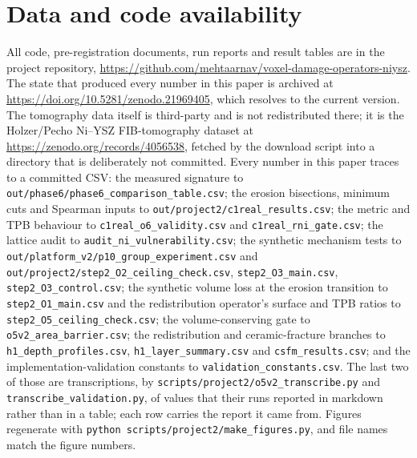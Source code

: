 \documentclass[5p,times,twocolumn]{elsarticle}
\begin{document}
\section*{Data and code availability}

\begingroup\sloppy
All code, pre-registration documents, run reports and result tables are in the
project repository, \url{https://github.com/mehtaarnav/voxel-damage-operators-niysz}.
The state that produced every number in this paper is archived at
\url{https://doi.org/10.5281/zenodo.21969405}, which resolves to the current
version.
The tomography data itself is third-party and is not redistributed there; it is
the Holzer/Pecho Ni--YSZ FIB-tomography dataset at
\url{https://zenodo.org/records/4056538}, fetched by the download script into a
directory that is deliberately not committed.
Every number in this paper
traces to a committed CSV: the measured signature to
\texttt{out/phase6/phase6\_comparison\_table.csv}; the erosion bisections,
minimum cuts and Spearman inputs to \texttt{out/project2/c1real\_results.csv};
the metric and TPB behaviour to \texttt{c1real\_o6\_validity.csv} and
\texttt{c1real\_rni\_gate.csv}; the lattice audit to
\texttt{audit\_ni\_vulnerability.csv}; the synthetic mechanism tests to
\texttt{out/platform\_v2/p10\_group\_experiment.csv} and
\texttt{out/project2/step2\_O2\_ceiling\_check.csv},
\texttt{step2\_O3\_main.csv}, \texttt{step2\_O3\_control.csv}; the synthetic
volume loss at the erosion transition to \texttt{step2\_O1\_main.csv} and the
redistribution operator's surface and TPB ratios to
\texttt{step2\_O5\_ceiling\_check.csv}; the
volume-conserving gate to \texttt{o5v2\_area\_barrier.csv}; the redistribution
and ceramic-fracture branches to
\texttt{h1\_depth\_profiles.csv}, \texttt{h1\_layer\_summary.csv} and
\texttt{csfm\_results.csv}; and the implementation-validation constants to
\texttt{validation\_constants.csv}. The last two of those are transcriptions,
by \texttt{scripts/project2/o5v2\_transcribe.py} and
\texttt{transcribe\_validation.py}, of values that their runs reported in
markdown rather than in a table; each row carries the report it came from.
Figures regenerate with
\texttt{python scripts/project2/make\_figures.py}, and file names match the
figure numbers.
\end{document}
